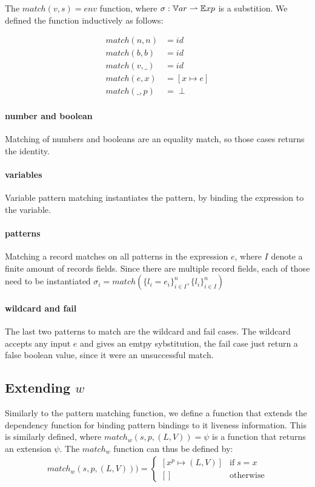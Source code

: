 \documentclass[../../master.tex]{subfiles}
\begin{document}
The $match(v,s)=env$ function, where $\sigma:\mathbb{V}ar \rightharpoonup \mathbb{E}xp$ is a substition.
We defined the function inductively as follows:

\begin{align*}
	match(n,n) &= id\\
	match(b,b) &= id\\
	match(v,\_) &=id\\
	match(e,x) &= [x \mapsto e]\\
	match(\_,p) &= \perp
\end{align*}

\paragraph{number and boolean}
Matching of numbers and booleans are an equality match, so those cases returns the identity.

\paragraph{variables}
Variable pattern matching instantiates the pattern, by binding the expression to the variable.

\paragraph{patterns}
Matching a record matches on all patterns in the expression $e$, where $I$ denote a finite amount of records fields.
Since there are multiple record fields, each of those need to be instantiated
$\sigma_i=match(\{l_i=e_i\}^n_{i \in I},\{l_i\}^n_{i \in I})$

\paragraph{wildcard and fail}
The last two patterns to match are the wildcard and fail cases.
The wildcard accepts any input $e$ and gives an emtpy sybstitution, the fail case just return a false boolean value, since it were an unsuccessful match.


\subsection{Extending $w$}
Similarly to the pattern matching function, we define a function that extends the dependency function for binding pattern bindings to it liveness information.
This is similarly defined, where $match_w(s,p,(L,V))=\psi$ is a function that returns an extension $\psi$.
The $match_w$ function can thus be defined by:
\begin{align}
	match_w(s,p,(L,V))) =
	\left\{\begin{matrix}
		[x^p\mapsto (L,V)] & \mbox{if}\; s=x\\ 
		[] & \mbox{otherwise}
	\end{matrix}\right.
\end{align}
\end{document}
